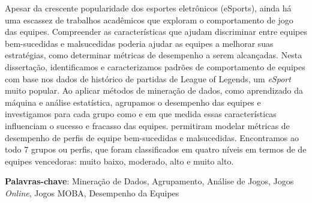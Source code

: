 Apesar da crescente popularidade dos esportes eletrônicos (eSports), ainda há uma escassez de trabalhos acadêmicos que exploram o comportamento de jogo das equipes. Compreender as características que ajudam discriminar entre equipes bem-sucedidas e malsucedidas poderia ajudar as equipes a melhorar suas estratégias, como determinar métricas de desempenho a serem alcançadas. Nesta dissertação, identificamos e caracterizamos padrões de comportamento de equipes com base nos dados de histórico de partidas de League of Legends, um \textit{eSport} muito popular. Ao aplicar métodos de mineração de dados, como aprendizado da máquina e análise estatística, agrupamos o desempenho das equipes e investigamos para cada grupo como e em que medida essas características influenciam o sucesso e fracasso das equipes.  permitiram modelar métricas de desempenho de perfis de equipe bem-sucedidas e malsucedidas. Encontramos ao todo 7 grupos ou perfis, que foram classificados em quatro níveis em termos de  de equipes vencedoras: muito baixo, moderado, alto e muito alto.




\textbf{Palavras-chave}: Mineração de Dados, Agrupamento, Análise de Jogos, Jogos \textit{Online}, Jogos MOBA, Desempenho da Equipes
